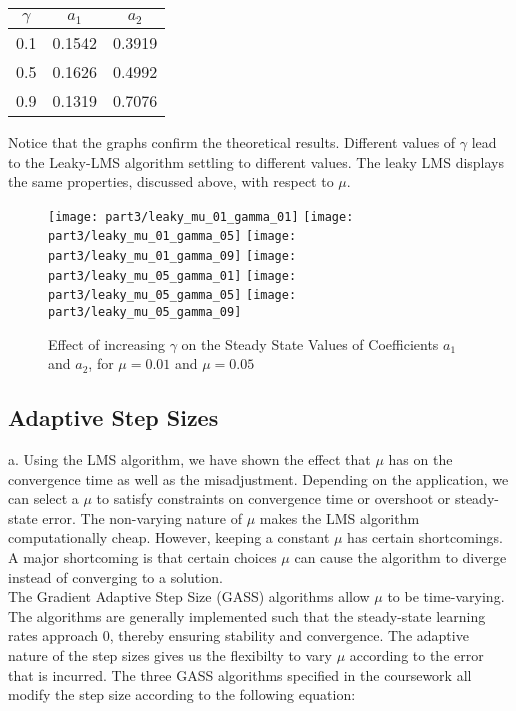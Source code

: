 \begin{table}[H]
\centering
\begin{tabular}{|c|c|c|}
\hline
$\gamma$ & $a_1$     & $a_2$     \\ \hline
0.1   & 0.1542 & 0.3919 \\ \hline
0.5   & 0.1626 & 0.4992 \\ \hline
0.9   & 0.1319 & 0.7076 \\ \hline
\end{tabular}
\end{table}

\noindent{}Notice that the graphs confirm the theoretical results. Different values of $\gamma$ lead to the Leaky-LMS algorithm settling to different values. The leaky LMS displays the same properties, discussed above, with respect to $\mu$.

\begin{figure}[H]
\centering{}
\texttt{[image: part3/leaky\_mu\_01\_gamma\_01]}
\texttt{[image: part3/leaky\_mu\_01\_gamma\_05]}
\texttt{[image: part3/leaky\_mu\_01\_gamma\_09]}
\texttt{[image: part3/leaky\_mu\_05\_gamma\_01]}
\texttt{[image: part3/leaky\_mu\_05\_gamma\_05]}
\texttt{[image: part3/leaky\_mu\_05\_gamma\_09]}
\caption{Effect of increasing $\gamma$ on the Steady State Values of Coefficients $a_1$ and $a_2$, for $\mu=0.01$ and $\mu=0.05$}
\label{fig:leaky_lms}
\end{figure}

\subsection{Adaptive Step Sizes}

\noindent{}a. Using the LMS algorithm, we have shown the effect that $\mu$ has on the convergence time as well as the misadjustment. Depending on the application, we can select a $\mu$ to satisfy constraints on convergence time or overshoot or steady-state error. The non-varying nature of $\mu$ makes the LMS algorithm computationally cheap. However, keeping a constant $\mu$ has certain shortcomings. A major shortcoming is that certain choices $\mu$ can cause the algorithm to diverge instead of converging to a solution. \\

\noindent{}The Gradient Adaptive Step Size (GASS) algorithms allow $\mu$ to be time-varying. The algorithms are generally implemented such that the steady-state learning rates approach 0, thereby ensuring stability and convergence. The adaptive nature of the step sizes gives us the flexibilty to vary $\mu$ according to the error that is incurred. The three GASS algorithms specified in the coursework all modify the step size according to the following equation:

